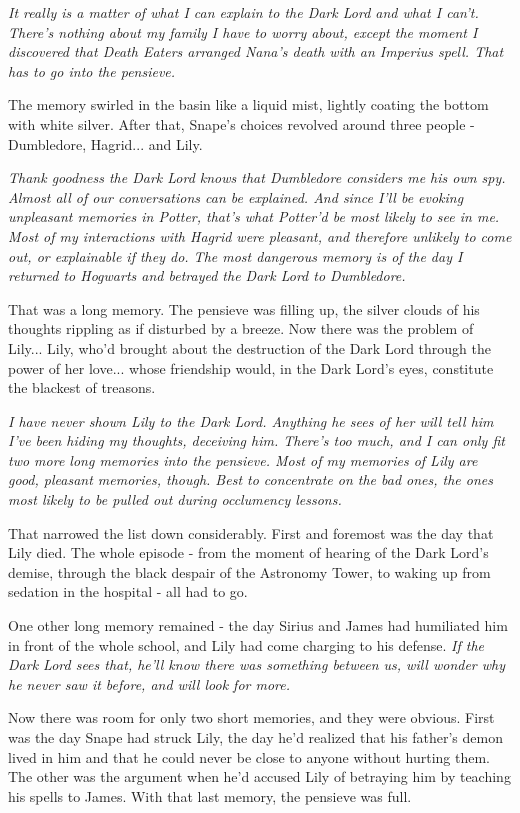 \emph{It really is a matter of what I can explain to the Dark Lord and what I can't. There's nothing about my family I have to worry about, except the moment I discovered that Death Eaters arranged Nana's death with an Imperius spell. That has to go into the pensieve.}

The memory swirled in the basin like a liquid mist, lightly coating the bottom with white silver. After that, Snape's choices revolved around three people - Dumbledore, Hagrid... and Lily.

\emph{Thank goodness the Dark Lord knows that Dumbledore considers me his own spy. Almost all of our conversations can be explained. And since I'll be evoking unpleasant memories in Potter, that's what Potter'd be most likely to see in me. Most of my interactions with Hagrid were pleasant, and therefore unlikely to come out, or explainable if they do. The most dangerous memory is of the day I returned to Hogwarts and betrayed the Dark Lord to Dumbledore.}

That was a long memory. The pensieve was filling up, the silver clouds of his thoughts rippling as if disturbed by a breeze. Now there was the problem of Lily... Lily, who'd brought about the destruction of the Dark Lord through the power of her love... whose friendship would, in the Dark Lord's eyes, constitute the blackest of treasons.

\emph{I have never shown Lily to the Dark Lord. Anything he sees of her will tell him I've been hiding my thoughts, deceiving him. There's too much, and I can only fit two more long memories into the pensieve. Most of my memories of Lily are good, pleasant memories, though. Best to concentrate on the bad ones, the ones most likely to be pulled out during occlumency lessons.}

That narrowed the list down considerably. First and foremost was the day that Lily died. The whole episode - from the moment of hearing of the Dark Lord's demise, through the black despair of the Astronomy Tower, to waking up from sedation in the hospital - all had to go.

One other long memory remained - the day Sirius and James had humiliated him in front of the whole school, and Lily had come charging to his defense. \emph{If the Dark Lord sees that, he'll know there was something between us, will wonder why he never saw it before, and will look for more.}

Now there was room for only two short memories, and they were obvious. First was the day Snape had struck Lily, the day he'd realized that his father's demon lived in him and that he could never be close to anyone without hurting them. The other was the argument when he'd accused Lily of betraying him by teaching his spells to James. With that last memory, the pensieve was full.

